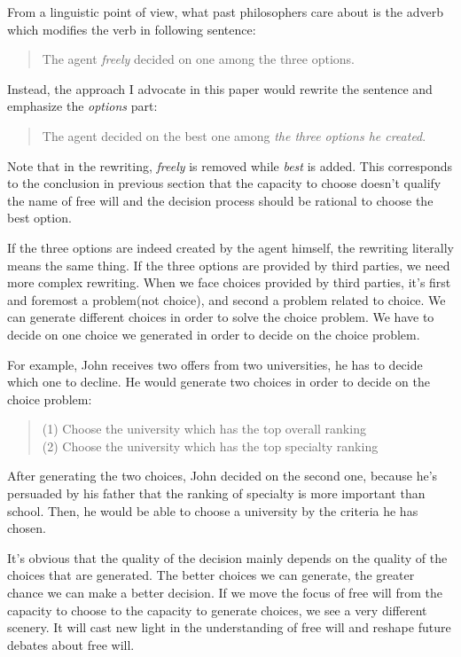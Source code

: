 From a linguistic point of view, what past philosophers care about is the adverb which modifies the verb in following sentence:

\begin{quote}
  The agent \emph{freely} decided on one among the three options.
\end{quote}

Instead, the approach I advocate in this paper would rewrite the sentence and emphasize the \emph{options} part:

\begin{quote}
  The agent decided on the best one among \emph{the three options he created}.
\end{quote}

Note that in the rewriting, \emph{freely} is removed while \emph{best} is added. This corresponds to the conclusion in previous section that the capacity to choose doesn't qualify the name of free will and the decision process should be rational to choose the best option.

If the three options are indeed created by the agent himself, the rewriting literally means the same thing. If the three options are provided by third parties, we need more complex rewriting. When we face choices provided by third parties, it's first and foremost a problem(not choice), and second a problem related to choice. We can generate different choices in order to solve the choice problem. We have to decide on one choice we generated in order to decide on the choice problem.

For example, John receives two offers from two universities, he has to decide which one to decline. He would generate two choices in order to decide on the choice problem:

\begin{quote}
(1) Choose the university which has the top overall ranking \\
(2) Choose the university which has the top specialty ranking
\end{quote}

After generating the two choices, John decided on the second one, because he's persuaded by his father that the ranking of specialty is more important than school. Then, he would be able to choose a university by the criteria he has chosen.

It's obvious that the quality of the decision mainly depends on the quality of the choices that are generated. The better choices we can generate, the greater chance we can make a better decision. If we move the focus of free will from the capacity to choose to the capacity to generate choices, we see a very different scenery. It will cast new light in the understanding of free will and reshape future debates about free will.

